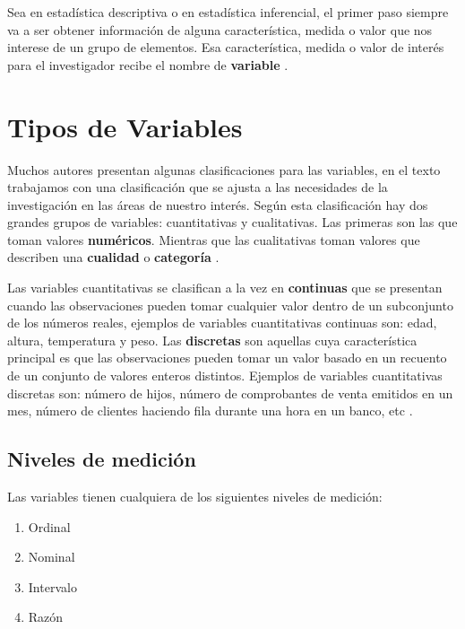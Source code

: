 \documentclass[
]{krantz}
\providecommand{\tightlist}{%
  \setlength{\itemsep}{0pt}\setlength{\parskip}{0pt}}
\begin{document}
Sea en estadística descriptiva o en estadística inferencial, el primer paso siempre va a ser obtener información de alguna característica, medida o valor que nos interese de un grupo de elementos. Esa característica, medida o valor de interés para el investigador recibe el nombre de \textbf{variable} \citep{keller2011}.

\hypertarget{tipos-de-variables}{%
\section{Tipos de Variables}\label{tipos-de-variables}}

Muchos autores presentan algunas clasificaciones para las variables, en el texto trabajamos con una clasificación que se ajusta a las necesidades de la investigación en las áreas de nuestro interés. Según esta clasificación hay dos grandes grupos de variables: cuantitativas y cualitativas. Las primeras son las que toman valores \textbf{numéricos}. Mientras que las cualitativas toman valores que describen una \textbf{cualidad} o \textbf{categoría} \citep{ross2008}.

Las variables cuantitativas se clasifican a la vez en \textbf{continuas} que se presentan cuando las observaciones pueden tomar cualquier valor dentro de un subconjunto de los números reales, ejemplos de variables cuantitativas continuas son: edad, altura, temperatura y peso. Las \textbf{discretas} son aquellas cuya característica principal es que las observaciones pueden tomar un valor basado en un recuento de un conjunto de valores enteros distintos. Ejemplos de variables cuantitativas discretas son: número de hijos, número de comprobantes de venta emitidos en un mes, número de clientes haciendo fila durante una hora en un banco, etc \citep{devore2012}.

\hypertarget{niveles-de-medicion}{%
\subsection{Niveles de medición}\label{niveles-de-medicion}}

Las variables tienen cualquiera de los siguientes niveles de medición:

\begin{enumerate}
\def\labelenumi{\arabic{enumi}.}
\tightlist
\item
  Ordinal
\item
  Nominal
\item
  Intervalo
\item
  Razón
\end{enumerate}
\end{document}
